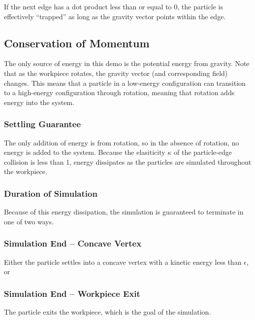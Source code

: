 		If the next edge has a dot product less than or equal to 0, the particle is effectively ``trapped'' as long as the gravity vector points within the edge.


	\subsection{Conservation of Momentum}

		The only source of energy in this demo is the potential energy from gravity. Note that as the workpiece rotates, the gravity vector (and corresponding field) changes. This means that a particle in a low-energy configuration can transition to a high-energy configuration through rotation, meaning that rotation adds energy into the system.

		\subsubsection{Settling Guarantee}

		The only addition of energy is from rotation, so in the absence of rotation, no energy is added to the system. Because the elasiticity $\kappa$ of the particle-edge collision is less than 1, energy dissipates as the particles are simulated throughout the workpiece.

		\subsubsection{Duration of Simulation}

		Because of this energy dissipation, the simulation is guaranteed to terminate in one of two ways.

		\subsubsection{Simulation End -- Concave Vertex}

		Either the particle settles into a concave vertex with a kinetic energy less than $\epsilon$, or

		\subsubsection{Simulation End -- Workpiece Exit}

		The particle exits the workpiece, which is the goal of the simulation.

